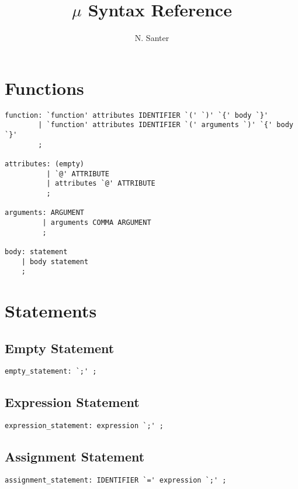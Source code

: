 \documentclass{article}
\title{$\mu$ Syntax Reference}
\author{N. Santer}
\begin{document}
\maketitle

\tableofcontents

\clearpage

\section{Functions}

\begin{lstlisting}
function: `function' attributes IDENTIFIER `(' `)' `{' body `}'
        | `function' attributes IDENTIFIER `(' arguments `)' `{' body `}'
        ;

attributes: (empty)
          | `@' ATTRIBUTE
          | attributes `@' ATTRIBUTE
          ;

arguments: ARGUMENT
         | arguments COMMA ARGUMENT
         ;

body: statement
    | body statement
    ;
\end{lstlisting}

\section{Statements}

\subsection{Empty Statement}

\begin{lstlisting}
empty_statement: `;' ;
\end{lstlisting}

\subsection{Expression Statement}

\begin{lstlisting}
expression_statement: expression `;' ;
\end{lstlisting}

\subsection{Assignment Statement}

\begin{lstlisting}
assignment_statement: IDENTIFIER `=' expression `;' ;
\end{lstlisting}
\end{document}
